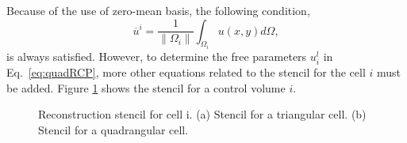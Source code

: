\documentclass[review]{elsarticle}
\begin{document}
Because of the use of zero-mean basis, the following condition,
\begin{equation}\label{eq:cellAVGCond}
	\overline{u}^i=\frac{1}{\|\Omega_i\|}\int_{\Omega_i}u(x,y)d\Omega,
\end{equation}
is always satisfied. However, to determine the free parameters $u^l_i$ in Eq.~\eqref{eq:quadRCP}, more other equations related to the stencil for the cell $i$ must be added. Figure \ref{fig:stencil} shows the stencil for a control volume $i$.

\begin{figure}[!htp]
	\centering
	\caption{Reconstruction stencil for cell i. (a) Stencil for a triangular cell. (b) Stencil for a quadrangular cell.}
	\label{fig:stencil}
\end{figure}
\end{document}
